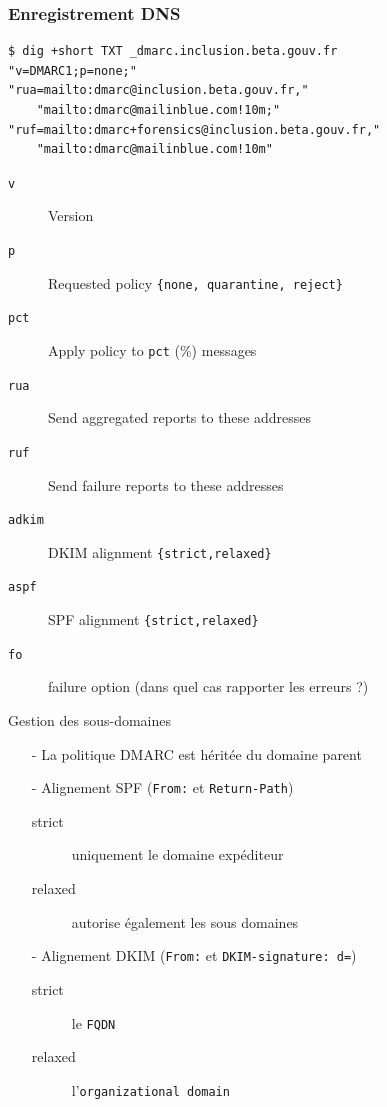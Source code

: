 \documentclass{beamer}
\begin{document}
\begin{frame}[fragile]
    \frametitle{Enregistrement DNS}
    \begin{verbatim}
$ dig +short TXT _dmarc.inclusion.beta.gouv.fr
"v=DMARC1;p=none;"
"rua=mailto:dmarc@inclusion.beta.gouv.fr,"
    "mailto:dmarc@mailinblue.com!10m;"
"ruf=mailto:dmarc+forensics@inclusion.beta.gouv.fr,"
    "mailto:dmarc@mailinblue.com!10m"
    \end{verbatim}

    \begin{description}
        \item[\texttt{v}] Version
        \item[\texttt{p}] Requested policy \texttt{\{none, quarantine, reject\}}
        \item[\texttt{pct}] Apply policy to \texttt{pct} (\%) messages
        \item[\texttt{rua}] Send aggregated reports to these addresses
        \item[\texttt{ruf}] Send failure reports to these addresses
        \item[\texttt{adkim}] DKIM alignment \texttt{\{strict,relaxed\}}
        \item[\texttt{aspf}] SPF alignment \texttt{\{strict,relaxed\}}
        \item[\texttt{fo}] failure option (dans quel cas rapporter les erreurs ?)
    \end{description}
\end{frame}

\begin{frame}{Gestion des sous-domaines}
    \begin{enumerate}
        \item[-] La politique DMARC est héritée du domaine parent
        \item[-] Alignement SPF (\texttt{From:} et \texttt{Return-Path})
            \begin{description}
                \item[strict] uniquement le domaine expéditeur
                \item[relaxed] autorise également les sous domaines
            \end{description}
        \item[-] Alignement DKIM (\texttt{From:} et \texttt{DKIM-signature: d=})
            \begin{description}
                \item[strict] le \texttt{FQDN}
                \item[relaxed] l'\texttt{organizational domain}
            \end{description}
    \end{enumerate}
\end{frame}
\end{document}
